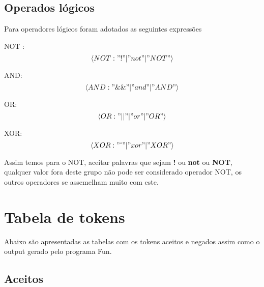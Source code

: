 \documentclass[
	article,			%
	11pt,				%
	oneside,			%
	a4paper,			%
	portuguese,			%
	brazil,				%
	sumario=tradicional
	]{abntex2}
\begin{document}
\subsection{Operados lógicos}

Para operadores lógicos foram adotados as seguintes expressões

NOT : 
\[ \left< NOT : "!"  \vert  "not"  \vert  "NOT" \right> \]

AND:
\[ \left< AND : "\&\&"  \vert  "and"  \vert  "AND" \right> \]

OR:
\[ \left< OR : "\vert\vert"  \vert  "or"  \vert  "OR" \right> \]

XOR:
\[ \left< XOR : "  \hat{\ }  "  \vert  "xor"  \vert  "XOR" \right> \]

Assim temos para o NOT, aceitar palavras que sejam \textbf{!} ou \textbf{not} ou \textbf{NOT}, qualquer valor fora deste grupo não pode ser considerado operador NOT, os outros operadores se assemelham muito com este.

\newpage
\section{Tabela de tokens}

Abaixo são apresentadas as tabelas com os tokens aceitos e negados assim como o output gerado pelo programa Fun.

\subsection{Aceitos}
\end{document}
